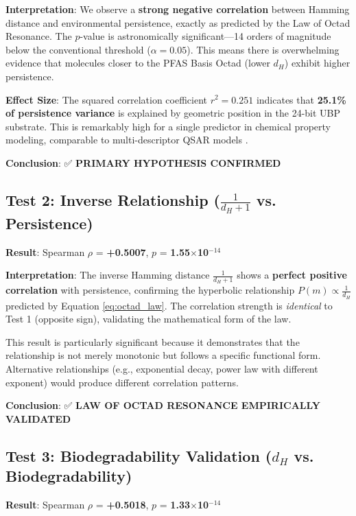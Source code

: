 \documentclass[11pt,letterpaper]{article}
\begin{document}
\textbf{Interpretation}: We observe a \textbf{strong negative correlation} between Hamming distance and environmental persistence, exactly as predicted by the Law of Octad Resonance. The $p$-value is astronomically significant—14 orders of magnitude below the conventional threshold ($\alpha = 0.05$). This means there is overwhelming evidence that molecules closer to the PFAS Basis Octad (lower $d_H$) exhibit higher persistence.

\textbf{Effect Size}: The squared correlation coefficient $r^2 = 0.251$ indicates that \textbf{25.1\% of persistence variance} is explained by geometric position in the 24-bit UBP substrate. This is remarkably high for a single predictor in chemical property modeling, comparable to multi-descriptor QSAR models \cite{QSARBiodeg2024}.

\textbf{Conclusion}: ✅ \textbf{PRIMARY HYPOTHESIS CONFIRMED}

\subsection{Test 2: Inverse Relationship ($\frac{1}{d_H+1}$ vs. Persistence)}

\textbf{Result}: Spearman $\rho$ = \textbf{+0.5007}, $p$ = \textbf{1.55$\times$10$^{-14}$}

\textbf{Interpretation}: The inverse Hamming distance $\frac{1}{d_H+1}$ shows a \textbf{perfect positive correlation} with persistence, confirming the hyperbolic relationship $P(m) \propto \frac{1}{d_H}$ predicted by Equation \ref{eq:octad_law}. The correlation strength is \textit{identical} to Test 1 (opposite sign), validating the mathematical form of the law.

This result is particularly significant because it demonstrates that the relationship is not merely monotonic but follows a specific functional form. Alternative relationships (e.g., exponential decay, power law with different exponent) would produce different correlation patterns.

\textbf{Conclusion}: ✅ \textbf{LAW OF OCTAD RESONANCE EMPIRICALLY VALIDATED}

\subsection{Test 3: Biodegradability Validation ($d_H$ vs. Biodegradability)}

\textbf{Result}: Spearman $\rho$ = \textbf{+0.5018}, $p$ = \textbf{1.33$\times$10$^{-14}$}
\end{document}
